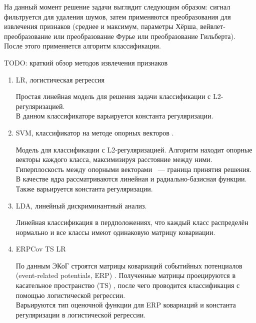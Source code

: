 \documentclass[a4paper, 12pt]{article}
\begin{document}
	На данный момент решение задачи выглядит следующим образом: сигнал фильтруется для удаления шумов, затем применяются преобразования для извлечения признаков (среднее и максимум, параметры Хёрша, вейвлет-преобразование или преобразование Фурье или преобразование Гильберта). После этого применяется алгоритм классификации.
	
	TODO: краткий обзор методов извлечения признаков
	
	\begin{enumerate}
		\item LR, логистическая регрессия \cite{scikit-learn}
		
		Простая линейная модель для решения задачи классификации с L2-регуляризацией.\\
		В данном классификаторе варьируется константа регуляризации.
		
		\item SVM, классификатор на методе опорных векторов \cite{scikit-learn}. 
		
		Модель для классификации с L2-регуляризацией. Алгоритм находит опорные векторы каждого класса, максимизируя расстояние между ними. Гиперплоскость между опорными векторами ~--- граница принятия решения.\\
		В качестве ядра рассматриваются линейная и радиально-базисная функции. Также варьируется константа регуляризации.
		
		\item LDA, линейный дискриминантный анализ.
		
		Линейная классификация в пердположениях, что каждый класс распределён нормально и все классы имеют одинаковую матрицу ковариации.\cite{scikit-learn}
		
		\item ERPCov TS LR
		
		По данным ЭКоГ строятся матрицы ковариаций событийных потенциалов (event-related potentials, ERP) \cite{PyRiemann}. Полученные матрицы проецируются в касательное пространство (TS) \cite{PyRiemann}, после чего проводится классификация с помощью логистической регрессии.\\
		Варьируются тип оценочной функции для ERP ковариаций и константа регуляризации в логистической регрессии.
		
	\end{enumerate}
	
	\newpage
\end{document}

